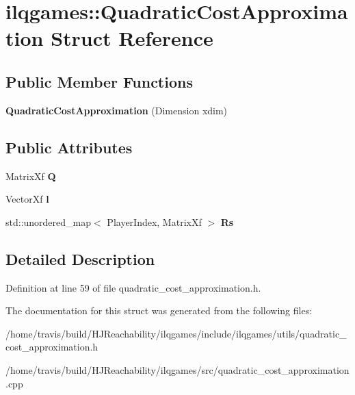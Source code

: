 \hypertarget{structilqgames_1_1_quadratic_cost_approximation}{}\section{ilqgames\+:\+:Quadratic\+Cost\+Approximation Struct Reference}
\label{structilqgames_1_1_quadratic_cost_approximation}
\subsection*{Public Member Functions}
\begin{DoxyCompactItemize}
\item 
{\bfseries Quadratic\+Cost\+Approximation} (Dimension xdim)\hypertarget{structilqgames_1_1_quadratic_cost_approximation_af7493609c0dbfb52beb6ec7b41f5a064}{}\label{structilqgames_1_1_quadratic_cost_approximation_af7493609c0dbfb52beb6ec7b41f5a064}

\end{DoxyCompactItemize}
\subsection*{Public Attributes}
\begin{DoxyCompactItemize}
\item 
Matrix\+Xf {\bfseries Q}\hypertarget{structilqgames_1_1_quadratic_cost_approximation_a09a867a42f4bd6055cbf1c61de8ffc24}{}\label{structilqgames_1_1_quadratic_cost_approximation_a09a867a42f4bd6055cbf1c61de8ffc24}

\item 
Vector\+Xf {\bfseries l}\hypertarget{structilqgames_1_1_quadratic_cost_approximation_a646c49414531c18e53168b2529984108}{}\label{structilqgames_1_1_quadratic_cost_approximation_a646c49414531c18e53168b2529984108}

\item 
std\+::unordered\+\_\+map$<$ Player\+Index, Matrix\+Xf $>$ {\bfseries Rs}\hypertarget{structilqgames_1_1_quadratic_cost_approximation_a532814e54708561f35f519b7d7e1b2c5}{}\label{structilqgames_1_1_quadratic_cost_approximation_a532814e54708561f35f519b7d7e1b2c5}

\end{DoxyCompactItemize}


\subsection{Detailed Description}


Definition at line 59 of file quadratic\+\_\+cost\+\_\+approximation.\+h.



The documentation for this struct was generated from the following files\+:\begin{DoxyCompactItemize}
\item 
/home/travis/build/\+H\+J\+Reachability/ilqgames/include/ilqgames/utils/quadratic\+\_\+cost\+\_\+approximation.\+h\item 
/home/travis/build/\+H\+J\+Reachability/ilqgames/src/quadratic\+\_\+cost\+\_\+approximation.\+cpp\end{DoxyCompactItemize}
